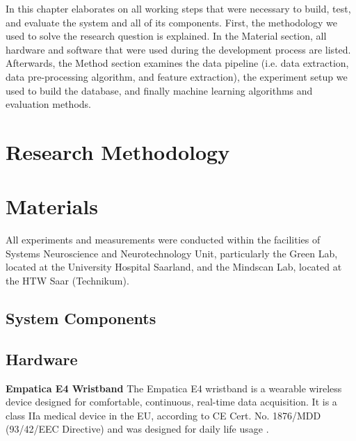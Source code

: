 In this chapter elaborates on all working steps that were necessary to build, test, and evaluate the system and all of its components. First, the methodology we used to solve the research question is explained. In the Material section, all hardware and software that were used during the development process are listed. Afterwards, the Method section examines the data pipeline (i.e. data extraction, data pre-processing algorithm, and feature extraction), the experiment setup we used to build the database, and finally machine learning algorithms and evaluation methods.
\section{Research Methodology}
\section{Materials}
All experiments and measurements were conducted within the facilities of Systems Neuroscience and Neurotechnology Unit, particularly the Green Lab, located at the University Hospital Saarland, and the Mindscan Lab, located at the HTW Saar (Technikum).

\subsection{System Components}
\subsection{Hardware}
\textbf{Empatica E4 Wristband}
The Empatica E4 wristband is a wearable wireless device designed for comfortable, continuous, real-time data acquisition. It is a class IIa medical device in the EU, according to CE Cert. No. 1876/MDD (93/42/EEC Directive) and was designed for daily life usage \cite{e4}.


